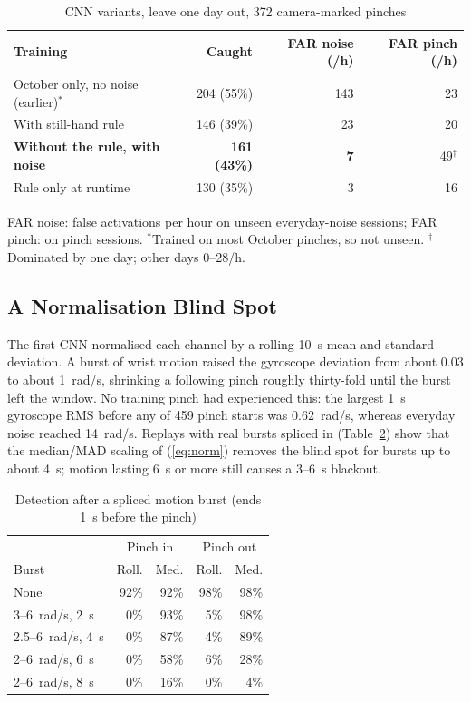 \begin{table}[t]
  \centering
  \caption{CNN variants, leave one day out, 372 camera-marked pinches}
  \label{tab:lodo}
  \small
  \begin{tabular}{@{}lrrr@{}}
    \toprule
    Training & Caught & FAR noise (/h) & FAR pinch (/h) \\
    \midrule
    October only, no noise (earlier)$^\ast$ & 204 (55\%) & 143 & 23 \\
    With still-hand rule & 146 (39\%) & 23 & 20 \\
    \textbf{Without the rule, with noise} & \textbf{161 (43\%)} & \textbf{7} & 49$^\dagger$ \\
    Rule only at runtime & 130 (35\%) & 3 & 16 \\
    \bottomrule
  \end{tabular}\par\smallskip
  {\footnotesize FAR noise: false activations per hour on unseen everyday-noise sessions; FAR pinch: on pinch sessions.
  $^\ast$Trained on most October pinches, so not unseen. $^\dagger$Dominated by one day; other days 0--28/h.\par}
\end{table}

\subsection{A Normalisation Blind Spot}

The first CNN normalised each channel by a rolling 10~s mean and standard deviation. A burst of wrist motion raised the gyroscope deviation from about 0.03 to about 1~rad/s, shrinking a following pinch roughly thirty-fold until the burst left the window. No training pinch had experienced this: the largest 1~s gyroscope RMS before any of 459 pinch starts was 0.62~rad/s, whereas everyday noise reached 14~rad/s. Replays with real bursts spliced in (Table~\ref{tab:hangover}) show that the median/MAD scaling of (\ref{eq:norm}) removes the blind spot for bursts up to about 4~s; motion lasting 6~s or more still causes a 3--6~s blackout.

\begin{table}[t]
  \centering
  \caption{Detection after a spliced motion burst (ends 1~s before the pinch)}
  \label{tab:hangover}
  \small
  \begin{tabular}{@{}lrrrr@{}}
    \toprule
     & \multicolumn{2}{c}{Pinch in} & \multicolumn{2}{c}{Pinch out} \\
    Burst & Roll. & Med. & Roll. & Med. \\
    \midrule
    None & 92\% & 92\% & 98\% & 98\% \\
    3--6~rad/s, 2~s & 0\% & 93\% & 5\% & 98\% \\
    2.5--6~rad/s, 4~s & 0\% & 87\% & 4\% & 89\% \\
    2--6~rad/s, 6~s & 0\% & 58\% & 6\% & 28\% \\
    2--6~rad/s, 8~s & 0\% & 16\% & 0\% & 4\% \\
    \bottomrule
  \end{tabular}
\end{table}


